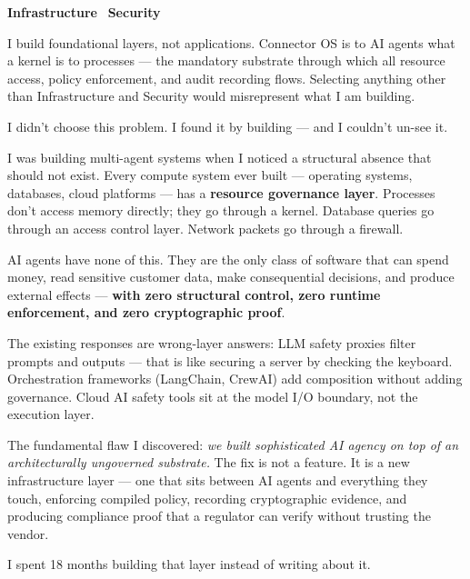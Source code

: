 \documentclass[10pt,a4paper]{article}
\newcommand{\qblock}[2]{%
  \vspace{8pt}
  \noindent
  \begin{tcolorbox}[qbase,
    colback=CSoft,
    title={\small\bfseries\color{CBlue} #1},
    attach boxed title to top left={yshift=-2mm,xshift=6pt},
    boxed title style={colback=CBlue,arc=2pt,boxrule=0pt,
      fonttitle=\small\bfseries\color{white}}]
  #2
  \end{tcolorbox}
}
\begin{document}
\qblock{Q4 — Domains / sectors}{

\textbf{Infrastructure} \textbullet\ \textbf{Security}

\medskip
I build foundational layers, not applications.
Connector OS is to AI agents what a kernel is to processes — the mandatory
substrate through which all resource access, policy enforcement, and audit recording flows.
Selecting anything other than Infrastructure and Security would misrepresent what I am building.

}

\qblock{Q5 — How you landed on this problem space}{

I didn't choose this problem. I found it by building — and I couldn't un-see it.

I was building multi-agent systems when I noticed a structural absence that should not exist.
Every compute system ever built — operating systems, databases, cloud platforms — has a
\textbf{resource governance layer}. Processes don't access memory directly; they go through a kernel.
Database queries go through an access control layer. Network packets go through a firewall.

AI agents have none of this. They are the only class of software that can spend money, read sensitive
customer data, make consequential decisions, and produce external effects —
\textbf{with zero structural control, zero runtime enforcement, and zero cryptographic proof}.

The existing responses are wrong-layer answers:
LLM safety proxies filter prompts and outputs — that is like securing a server by checking the keyboard.
Orchestration frameworks (LangChain, CrewAI) add composition without adding governance.
Cloud AI safety tools sit at the model I/O boundary, not the execution layer.

The fundamental flaw I discovered:
\textit{we built sophisticated AI agency on top of an architecturally ungoverned substrate.}
The fix is not a feature. It is a new infrastructure layer — one that sits between AI agents and
everything they touch, enforcing compiled policy, recording cryptographic evidence,
and producing compliance proof that a regulator can verify without trusting the vendor.

I spent 18 months building that layer instead of writing about it.

}
\end{document}
